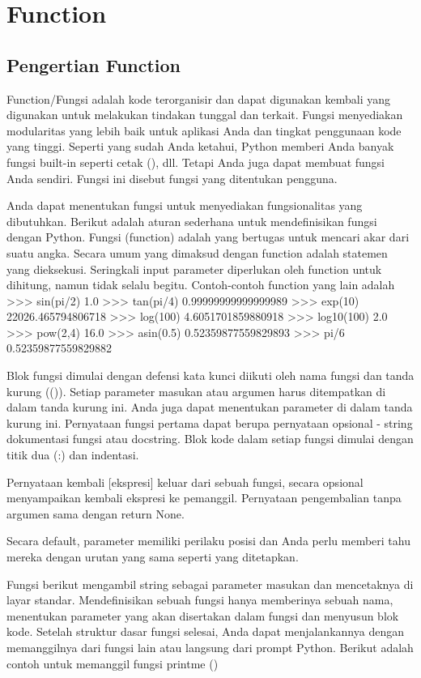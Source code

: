 \section{Function}
\subsection{Pengertian Function}
Function/Fungsi adalah kode terorganisir dan dapat digunakan kembali yang digunakan untuk melakukan tindakan tunggal dan terkait. 
Fungsi menyediakan modularitas yang lebih baik untuk aplikasi Anda dan tingkat penggunaan kode yang tinggi. Seperti yang sudah Anda ketahui, 
Python memberi Anda banyak fungsi built-in seperti cetak (), dll. Tetapi Anda juga dapat membuat fungsi Anda sendiri. 
Fungsi ini disebut fungsi yang ditentukan pengguna.

Anda dapat menentukan fungsi untuk menyediakan fungsionalitas yang dibutuhkan. Berikut adalah aturan sederhana untuk mendefinisikan fungsi dengan Python. 
Fungsi (function) adalah yang bertugas untuk mencari akar dari suatu angka. Secara umum yang dimaksud dengan function adalah statemen
yang dieksekusi. Seringkali input parameter diperlukan oleh function untuk dihitung, namun tidak selalu begitu. Contoh-contoh function yang lain adalah
>>> sin(pi/2)
1.0
>>> tan(pi/4)
0.99999999999999989
>>> exp(10)
22026.465794806718
>>> log(100)
4.6051701859880918
>>> log10(100)
2.0
>>> pow(2,4)
16.0
>>> asin(0.5)
0.52359877559829893
>>> pi/6
0.52359877559829882
 



Blok fungsi dimulai dengan defensi kata kunci diikuti oleh nama fungsi dan tanda kurung (()). 
Setiap parameter masukan atau argumen harus ditempatkan di dalam tanda kurung ini. Anda juga dapat menentukan parameter di dalam tanda kurung ini. 
Pernyataan fungsi pertama dapat berupa pernyataan opsional - string dokumentasi fungsi atau docstring. 
Blok kode dalam setiap fungsi dimulai dengan titik dua (:) dan indentasi. 

Pernyataan kembali [ekspresi] keluar dari sebuah fungsi, secara opsional menyampaikan kembali ekspresi ke pemanggil. Pernyataan pengembalian tanpa argumen sama dengan return None.

Secara default, parameter memiliki perilaku posisi dan Anda perlu memberi tahu mereka dengan urutan yang sama seperti yang ditetapkan.

Fungsi berikut mengambil string sebagai parameter masukan dan mencetaknya di layar standar.
Mendefinisikan sebuah fungsi hanya memberinya sebuah nama, menentukan parameter yang akan disertakan dalam fungsi dan menyusun blok kode. Setelah struktur dasar fungsi selesai, Anda dapat menjalankannya dengan memanggilnya dari fungsi lain atau langsung dari prompt Python. Berikut adalah contoh untuk memanggil fungsi printme ()

